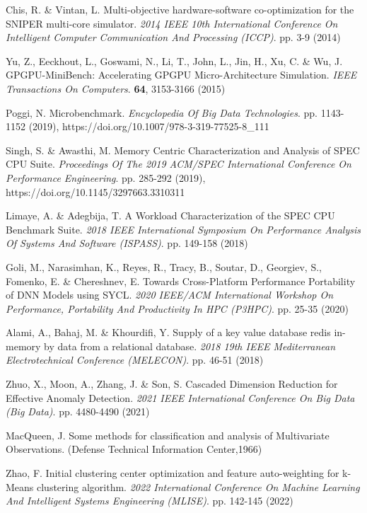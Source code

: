 \documentclass[]{PhDEngScITESO-R}
\begin{document}
\begin{thebibliography}{9}
Chis, R. \& Vintan, L. Multi-objective hardware-software co-optimization for the SNIPER multi-core simulator. {\em 2014 IEEE 10th International Conference On Intelligent Computer Communication And Processing (ICCP)}. pp. 3-9 (2014)

Yu, Z., Eeckhout, L., Goswami, N., Li, T., John, L., Jin, H., Xu, C. \& Wu, J. GPGPU-MiniBench: Accelerating GPGPU Micro-Architecture Simulation. {\em IEEE Transactions On Computers}. \textbf{64}, 3153-3166 (2015)

Poggi, N. Microbenchmark. {\em Encyclopedia Of Big Data Technologies}. pp. 1143-1152 (2019), https://doi.org/10.1007/978-3-319-77525-8\_111

Singh, S. \& Awasthi, M. Memory Centric Characterization and Analysis of SPEC CPU Suite. {\em Proceedings Of The 2019 ACM/SPEC International Conference On Performance Engineering}. pp. 285-292 (2019), https://doi.org/10.1145/3297663.3310311

Limaye, A. \& Adegbija, T. A Workload Characterization of the SPEC CPU Benchmark Suite. {\em 2018 IEEE International Symposium On Performance Analysis Of Systems And Software (ISPASS)}. pp. 149-158 (2018)

Goli, M., Narasimhan, K., Reyes, R., Tracy, B., Soutar, D., Georgiev, S., Fomenko, E. \& Chereshnev, E. Towards Cross-Platform Performance Portability of DNN Models using SYCL. {\em 2020 IEEE/ACM International Workshop On Performance, Portability And Productivity In HPC (P3HPC)}. pp. 25-35 (2020)

Alami, A., Bahaj, M. \& Khourdifi, Y. Supply of a key value database redis in-memory by data from a relational database. {\em 2018 19th IEEE Mediterranean Electrotechnical Conference (MELECON)}. pp. 46-51 (2018)

Zhuo, X., Moon, A., Zhang, J. \& Son, S. Cascaded Dimension Reduction for Effective Anomaly Detection. {\em 2021 IEEE International Conference On Big Data (Big Data)}. pp. 4480-4490 (2021)

MacQueen, J. Some methods for classification and analysis of Multivariate Observations. (Defense Technical Information Center,1966)

Zhao, F. Initial clustering center optimization and feature auto-weighting for k-Means clustering algorithm. {\em 2022 International Conference On Machine Learning And Intelligent Systems Engineering (MLISE)}. pp. 142-145 (2022)


\end{thebibliography}
\end{document}
